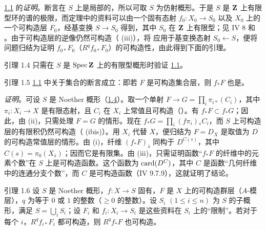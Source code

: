 \noindent
\hyperref[XIV.thm1.1]{1.1} 的\emph{证明}。断言在 $S$ 上是局部的，所以可取 $S$ 为仿射概形。于是 $S$ 是 $\mathbf{Z}$ 上有限型环的谱的极限，而定理中的资料可以由一个固有态射 $f_0:X_0\rightarrow S_0$ 以及 $X_0$ 上的一个可构造层 $F_0$，经基变换 $S\rightarrow S_0$ 得到，其中 $S_0$ 在 $\mathbf{Z}$ 上有限型；见 \EGA IV 8 和 。由于可构造层的逆像仍然可构造（ (iii)），将  应用于基变换态射 $S_0\leftarrow S$，便将问题归结为证明 $f_{0*}F_0$（\resp $R^qf_{0*}F_0$）的可构造性，由此得到下面的引理。

\begin{enonce*}{引理 1.4}
只需在 $S$ 是 $\operatorname{Spec}\mathbf{Z}$ 上的有限型概形时验证 \hyperref[XIV.thm1.1]{1.1}。
\end{enonce*}

\begin{enonce*}{引理 1.5}
\hyperref[XIV.thm1.1]{1.1} 中关于集合的断言成立：即若 $F$ 是可构造集合层，则 $f_*F$ 也是。
\end{enonce*}

\noindent
\emph{证明}。可设 $S$ 是 Noether 概形（\hyperref[XIV.lem1.4]{1.4}）。取一个单射 $F\rightarrow G=\prod_i\pi_{i*}(C_i)$，其中 $\pi_i:X_i\rightarrow X$ 是有限态射，且 $C_i$ 在 $X_i$ 上常值且可构造（）。有 $f_*F\subset f_*G$；因此，由  (ii)，只需处理 $F=G$ 的情形。现在 $f_*G=\prod_i(f\pi_i)_*C_i$，而 $S$ 上可构造层的有限积仍然可构造（ (ibis)）。用 $X_i$ 代替 $X$，便归结为 $F=D_X$ 是取值为 $D$ 的可构造常值层的情形。由  (i)，纤维 $(f_*F)_{\bar s}$ 同构于 $D^{C(s)}$，其中 $C(s)=\pi_0(X_{\bar s})$；\pageoriginale 因而它是有限集。由  (iii)，只需证明函数“$f_*F$ 的纤维中的元素个数”在 $S$ 上是可构造函数。这个函数为 $\operatorname{card}(D^C)$，其中 $C$ 是函数“几何纤维中的连通分支个数”，而 $C$ 是可构造函数（\EGA IV 9.7.9），这就证明了结论。

\begin{enonce*}{引理 1.6}
设 $S$ 是 Noether 概形，$f:X\rightarrow S$ 固有，$F$ 是 $X$ 上的可构造群层（\resp $A$-模层），$q$ 为等于 $0$ 或 $1$ 的整数（\resp $\geq0$ 的整数）。设 $S_i$ $(1\leq i\leq n)$ 为 $S$ 的子概形，满足 $S=\bigcup_iS_i$；设 $F_i$ 和 $f_i:X_i\rightarrow S_i$ 是这些资料在 $S_i$ 上的“限制”。若对于每个 $i$，$R^qf_{i*}F_i$ 都可构造，则 $R^qf_*F$ 也可构造。
\end{enonce*}

